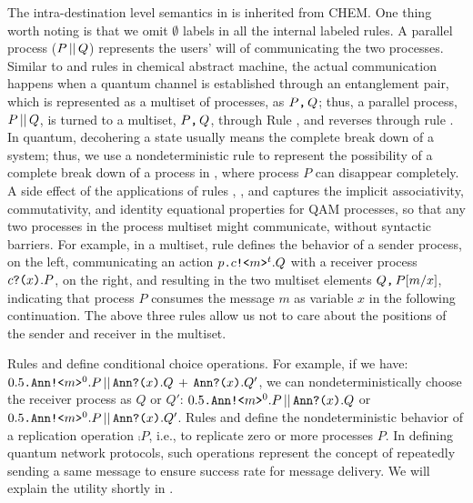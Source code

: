 The intra-destination level semantics in  is inherited from CHEM.
One thing worth noting is that we omit $\emptyset$ labels in all the internal labeled rules.
A parallel process ($P\,||\,Q$) represents the users' will of communicating the two processes.
Similar to  and  rules in chemical abstract machine,
the actual communication happens when a quantum channel is established through an entanglement pair,
which is represented as a multiset of processes, as $P\texttt{,}\,Q$;
thus, a parallel process, $P\,||\,Q$, is turned to a multiset, $P\texttt{,}\,Q$, through Rule ,
and reverses through rule .
In quantum, decohering a state usually means the complete break down of a system;
thus, we use a nondeterministic rule  to represent the possibility of a complete break down of a process in , where process $P$ can disappear completely.
A side effect of the applications of rules , , and  captures the implicit associativity, commutativity, and identity equational properties for QAM processes, so that any two processes in the process multiset might communicate, without syntactic barriers. For example, in a multiset, rule  defines the behavior of a sender process, on the left, communicating an action $p\texttt{.}c\texttt{!<}m\texttt{>}^t.Q$ with a receiver process $c\texttt{?(}x\texttt{)}.P$, on the right, and resulting in the two multiset elements $Q\texttt{,}\,P[m/x]$, indicating that process $P$ consumes the message $m$ as variable $x$ in the following continuation. The above three rules allow us not to care about the positions of the sender and receiver in the multiset.

Rules  and  define conditional choice operations. For example, if we have:
$0.5\texttt{.}\texttt{Ann}\texttt{!<}m\texttt{>}^0.P\,||\,\texttt{Ann}\texttt{?(}x\texttt{)}.Q\,+\,\texttt{Ann}\texttt{?(}x\texttt{)}.Q'$, 
we can nondeterministically choose the receiver process as $Q$ or $Q'$:
$0.5\texttt{.}\texttt{Ann}\texttt{!<}m\texttt{>}^0.P\,||\,\texttt{Ann}\texttt{?(}x\texttt{)}.Q$
or
$0.5\texttt{.}\texttt{Ann}\texttt{!<}m\texttt{>}^0.P\,||\,\texttt{Ann}\texttt{?(}x\texttt{)}.Q'$.
Rules  and  define the nondeterministic behavior of a replication operation $\comp{P}$,
i.e., to replicate zero or more processes $P$. In defining quantum network protocols, 
such operations represent the concept of repeatedly sending a same message to ensure success rate for message delivery.
We will explain the utility shortly in .

